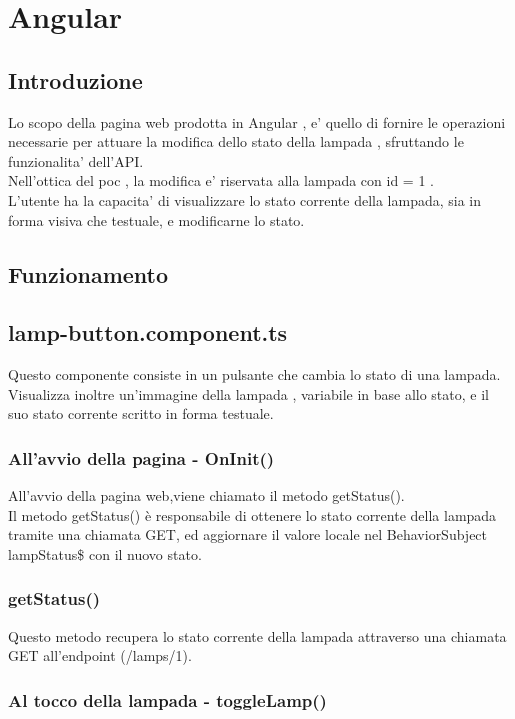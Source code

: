 \chapter{Angular}\label{angular}

\section{Introduzione}

Lo scopo della pagina web prodotta in Angular , e' quello di fornire le operazioni necessarie per attuare la modifica dello stato della lampada , sfruttando le funzionalita' dell'API. \\
Nell'ottica del poc , la modifica e' riservata alla lampada con id = 1 . \\
L'utente ha la capacita' di visualizzare lo stato corrente della lampada, sia in forma visiva che testuale, e modificarne lo stato. 

\section{Funzionamento}

\section{lamp-button.component.ts}
Questo componente consiste in un pulsante che cambia lo stato di una lampada. Visualizza inoltre un'immagine della lampada , variabile in base allo stato, e il suo stato corrente scritto in forma testuale.

\subsection{All'avvio della pagina - OnInit()}
All'avvio della pagina web,viene chiamato il metodo getStatus().\\
Il metodo getStatus() è responsabile di ottenere lo stato corrente della lampada tramite una chiamata GET, ed aggiornare il valore locale nel BehaviorSubject lampStatus\$ con il nuovo stato.

\subsection{getStatus()}
Questo metodo recupera lo stato corrente della lampada attraverso una chiamata GET all'endpoint (/lamps/1). \\

\subsection{Al tocco della lampada - toggleLamp()}

